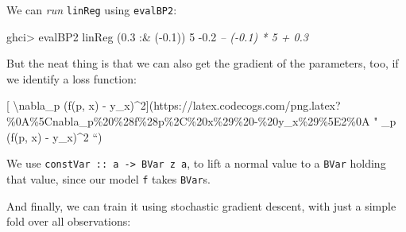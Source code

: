 \documentclass[]{article}
\newenvironment{Shaded}{}{}
\newcommand{\CommentTok}[1]{\textcolor[rgb]{0.38,0.63,0.69}{\textit{#1}}}
\newcommand{\DataTypeTok}[1]{\textcolor[rgb]{0.56,0.13,0.00}{#1}}
\newcommand{\DecValTok}[1]{\textcolor[rgb]{0.25,0.63,0.44}{#1}}
\newcommand{\FloatTok}[1]{\textcolor[rgb]{0.25,0.63,0.44}{#1}}
\newcommand{\FunctionTok}[1]{\textcolor[rgb]{0.02,0.16,0.49}{#1}}
\newcommand{\NormalTok}[1]{#1}
\newcommand{\OtherTok}[1]{\textcolor[rgb]{0.00,0.44,0.13}{#1}}
\begin{document}
We can \emph{run} \texttt{linReg} using \texttt{evalBP2}:

\begin{Shaded}
\begin{Highlighting}[]
\NormalTok{ghci}\FunctionTok{>}\NormalTok{ evalBP2 linReg (}\FloatTok{0.3} \FunctionTok{:&}\NormalTok{ (}\FunctionTok{-}\FloatTok{0.1}\NormalTok{)) }\DecValTok{5}
\FunctionTok{-}\FloatTok{0.2}        \CommentTok{-- (-0.1) * 5 + 0.3}
\end{Highlighting}
\end{Shaded}

But the neat thing is that we can also get the gradient of the parameters, too,
if we identify a loss function:

{[} \textbackslash{}nabla\_p (f(p, x) -
y\_x)\^{}2{]}(https://latex.codecogs.com/png.latex?\%0A\%5Cnabla\_p\%20\%28f\%28p\%2C\%20x\%29\%20-\%20y\_x\%29\%5E2\%0A
" \nabla\_p (f(p, x) - y\_x)\^{}2 ``)

\begin{Shaded}
\end{Shaded}

We use \texttt{constVar\ ::\ a\ -\textgreater{}\ BVar\ z\ a}, to lift a normal
value to a \texttt{BVar} holding that value, since our model \texttt{f} takes
\texttt{BVar}s.

And finally, we can train it using stochastic gradient descent, with just a
simple fold over all observations:
\end{document}

